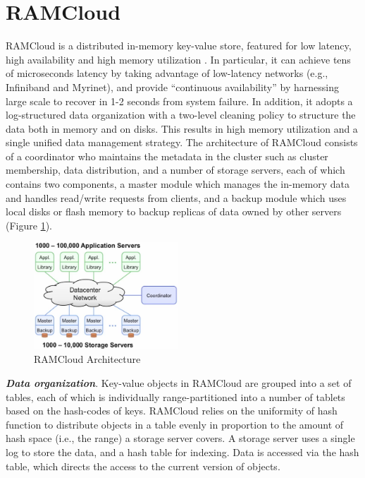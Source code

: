 \documentclass[twocolumn]{article}
\begin{document}
\section{RAMCloud}
RAMCloud is a distributed in-memory key-value store, featured for low latency, high availability and high memory utilization \cite{Ousterhout:2015}. In particular, it can achieve tens of microseconds latency
by taking advantage of low-latency networks (e.g., Infiniband and
Myrinet), and provide ``continuous availability'' by harnessing large
scale to recover in 1-2 seconds from system failure. In addition, it
adopts a log-structured data organization with a two-level cleaning
policy to structure the data both in memory and on disks. This results
in high memory utilization and a single unified data management
strategy. The architecture of RAMCloud consists of a coordinator who
maintains the metadata in the cluster such as cluster membership, data
distribution, and a number of storage servers, each of which contains
two components, a master module which manages the in-memory data and
handles read/write requests from clients, and a backup module which uses
local disks or flash memory to backup replicas of data owned by other
servers (Figure \ref{fig:ramcloud_architecture}).

\begin{figure}[htb]
        \centering
        \includegraphics[width=0.48\textwidth]{architecture_ramcloud.png}
        \caption{RAMCloud Architecture}
        \label{fig:ramcloud_architecture}
\end{figure}

\noindent
\textbf{\emph{Data organization}}. Key-value objects in RAMCloud are grouped into
a set of tables, each of which is individually range-partitioned into a
number of tablets based on the hash-codes of keys. RAMCloud relies on
the uniformity of hash function to distribute objects in a table evenly
in proportion to the amount of hash space (i.e., the range) a storage
server covers. A storage server uses a single log to store the data, and
a hash table for indexing. Data is accessed via the hash table, which
directs the access to the current version of objects.
\end{document}
